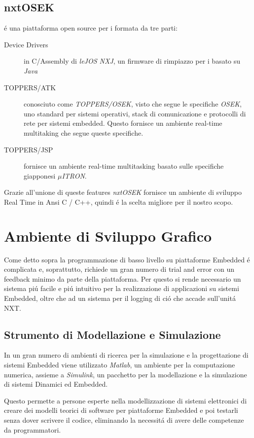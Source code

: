 \subsection{nxtOSEK}
\nxtOSEK{} \'e una piattaforma open source per i \nxt{} formata da tre
parti:
\begin{description}
    \item[Device Drivers]in C/Assembly di \emph{leJOS NXJ}, un firmware di
        rimpiazzo per i \nxt{} basato su \emph{Java}
    \item[TOPPERS/ATK]conosciuto come \emph{TOPPERS/OSEK}, visto che
        segue le specifiche \emph{OSEK}, uno standard per sistemi
        operativi, stack di comunicazione e protocolli di rete per sistemi
        embedded. Questo fornisce un ambiente real-time multitaking che
        segue queste specifiche.
    \item[TOPPERS/JSP]fornisce un ambiente real-time multitasking basato
        sulle specifiche giapponesi \emph{$\mu$ITRON}.
\end{description}
Grazie all'unione di queste features \emph{nxtOSEK} fornisce un ambiente di
sviluppo Real Time in Ansi C / C++, quindi \'e la scelta migliore per il nostro scopo.

\section{Ambiente di Sviluppo Grafico}
Come detto sopra la programmazione di basso livello su piattaforme
Embedded \'e complicata e, soprattutto, richiede un gran numero di trial
and error con un feedback minimo da parte della piattaforma. Per questo si
rende necessario un sistema pi\'u facile e pi\'u intuitivo per la
realizzazione di applicazioni su sistemi Embedded, oltre che ad un sistema
per il logging di ci\'o che accade sull'unit\'a NXT.

\subsection{Strumento di Modellazione e Simulazione}
In un gran numero di ambienti di ricerca per la simulazione e la
progettazione di sistemi Embedded viene utilizzato
\emph{Matlab}, un ambiente per la computazione numerica, assieme a \emph
{Simulink}, un pacchetto per la modellazione e la simulazione di sistemi
Dinamici ed Embedded.

Questo permette a persone esperte nella
modellizzazione di sistemi elettronici di creare dei modelli teorici di
software per piattaforme Embedded e poi testarli senza dover scrivere il
codice, eliminando la necessit\'a di avere delle competenze da
programmatori.

